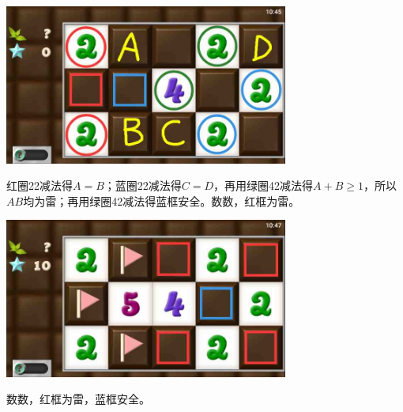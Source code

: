 \subsection{} %
\begin{center}
    \includegraphics[width=0.7\textwidth]{puzzlelow/120-1.jpg}
\end{center}
红圈22减法得$A=B$；蓝圈22减法得$C=D$，再用绿圈42减法得$A+B\ge 1$，所以$AB$均为雷；再用绿圈42减法得蓝框安全。数数，红框为雷。
\begin{center}
    \includegraphics[width=0.7\textwidth]{puzzlelow/120-2.jpg}
\end{center}
数数，红框为雷，蓝框安全。

